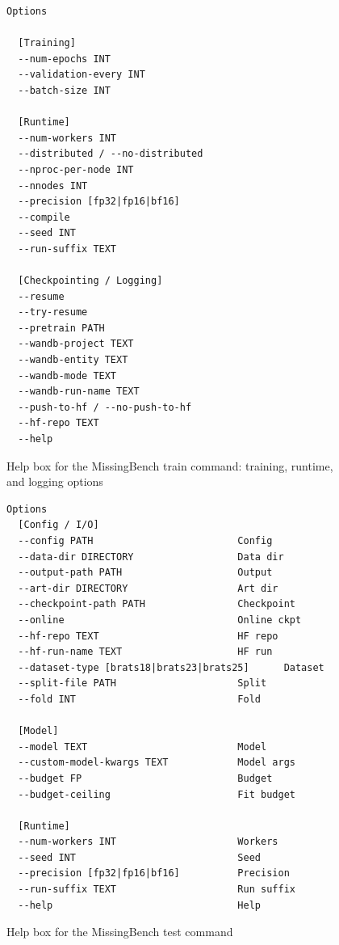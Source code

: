 \documentclass{article}
\begin{document}
\begin{figure}[h]
\centering
\begin{tcolorbox}[
  colback=lightgreenbg,
  colframe=lightgreenframe,
  arc=2mm,
  boxrule=0.6pt,
  title=MissingBench train: execution and logging,
  fonttitle=\bfseries
]
\begin{Verbatim}[breaklines=true,breakanywhere=true,fontsize=\small]
Options

  [Training]
  --num-epochs INT
  --validation-every INT
  --batch-size INT

  [Runtime]
  --num-workers INT
  --distributed / --no-distributed
  --nproc-per-node INT
  --nnodes INT
  --precision [fp32|fp16|bf16]
  --compile
  --seed INT
  --run-suffix TEXT

  [Checkpointing / Logging]
  --resume
  --try-resume
  --pretrain PATH
  --wandb-project TEXT
  --wandb-entity TEXT
  --wandb-mode TEXT
  --wandb-run-name TEXT
  --push-to-hf / --no-push-to-hf
  --hf-repo TEXT
  --help
\end{Verbatim}
\end{tcolorbox}
\caption{Help box for the MissingBench train command: training, runtime, and logging options}
\label{fig:missingbench_train_runtime}
\end{figure}

\begin{figure}[h]
\centering
\begin{tcolorbox}[
  colback=lightgreenbg,
  colframe=lightgreenframe,
  arc=2mm,
  boxrule=0.6pt,
  title=MissingBench test,
  fonttitle=\bfseries
]
\begin{Verbatim}[breaklines=true,breakanywhere=true,fontsize=\small]
Options
  [Config / I/O]
  --config PATH                         Config
  --data-dir DIRECTORY                  Data dir
  --output-path PATH                    Output
  --art-dir DIRECTORY                   Art dir
  --checkpoint-path PATH                Checkpoint
  --online                              Online ckpt
  --hf-repo TEXT                        HF repo
  --hf-run-name TEXT                    HF run
  --dataset-type [brats18|brats23|brats25]      Dataset
  --split-file PATH                     Split
  --fold INT                            Fold

  [Model]
  --model TEXT                          Model
  --custom-model-kwargs TEXT            Model args
  --budget FP                           Budget
  --budget-ceiling                      Fit budget

  [Runtime]
  --num-workers INT                     Workers
  --seed INT                            Seed
  --precision [fp32|fp16|bf16]          Precision
  --run-suffix TEXT                     Run suffix
  --help                                Help
\end{Verbatim}
\end{tcolorbox}
\caption{Help box for the MissingBench test command}
\label{fig:missingbench_test}
\end{figure}
\end{document}
